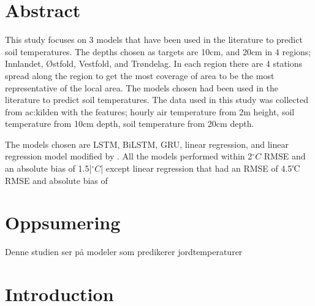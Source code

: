 
\section*{Abstract}
This study focuses on 3 models that have been used in the literature to predict soil temperatures. The depths chosen as targets are 10cm, and 20cm in 4 regions; Innlandet, Østfold, Vestfold, and Trøndelag. In each region there are 4 stations spread along the region to get the most coverage of area to be the most representative of the local area. The models chosen had been used in the literature to predict soil temperatures. The data used in this study was collected from \acrshort{ac:kilden} with the features; hourly air temperature from 2m height, soil temperature from 10cm depth, soil temperature from 20cm depth.

The models chosen are LSTM, BiLSTM, GRU, linear regression, and linear regression model modified by \citeauthor{plauborg_simple_2002}. All the models performed within 2$^\circ C$ RMSE and an absolute bias of 1.5|$^\circ C$| except linear regression that had an RMSE of 4.5℃ RMSE  and absolute bias of 

\section*{Oppsumering}
Denne studien ser på modeler som predikerer jordtemperaturer






\section{Introduction}

